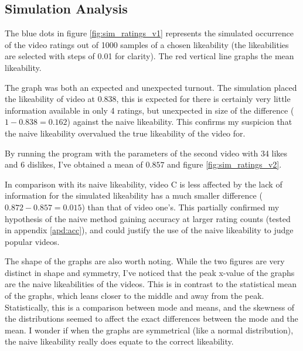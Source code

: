 \documentclass[a4paper,11pt]{article}
\begin{document}
\subsection{Simulation Analysis}
The blue dots in figure \ref{fig:sim_ratings_v1} represents the simulated occurrence of the video ratings out of 1000 samples of a chosen likeability (the likeabilities are selected with steps of 0.01 for clarity). The red vertical line graphs the mean likeability.

The graph was both an expected and unexpected turnout. The simulation placed the likeability of video at $0.838$, this is expected for there is certainly very little information available in only 4 ratings, but unexpected in size of the difference ($1-0.838=0.162$) against the naive likeability. This confirms my suspicion that the naive likeability overvalued the true likeability of the video for.

By running the program with the parameters of the second video with 34 likes and 6 dislikes,
I've obtained a mean of $0.857$ and figure \ref{fig:sim_ratings_v2}.

In comparison with its naive likeability, video C is less affected by the lack of information for the simulated likeability has a much smaller difference ($0.872-0.857=0.015$) than that of video one's. This partially confirmed my hypothesis of the naive method gaining accuracy at larger rating counts (tested in appendix \ref{apd:acc}), and could justify the use of the naive likeability to judge popular videos.

The shape of the graphs are also worth noting.
While the two figures are very distinct in shape and symmetry, I've noticed that the peak x-value of the graphs are the naive likeabilities of the videos. This is in contrast to the statistical mean of the graphs, which leans closer to the middle and away from the peak. Statistically, this is a comparison between mode and means, and the skewness of the distributions seemed to affect the exact differences between the mode and the mean. I wonder if when the graphs are symmetrical (like a normal distribution), the naive likeability really does equate to the correct likeability.

\end{document}
